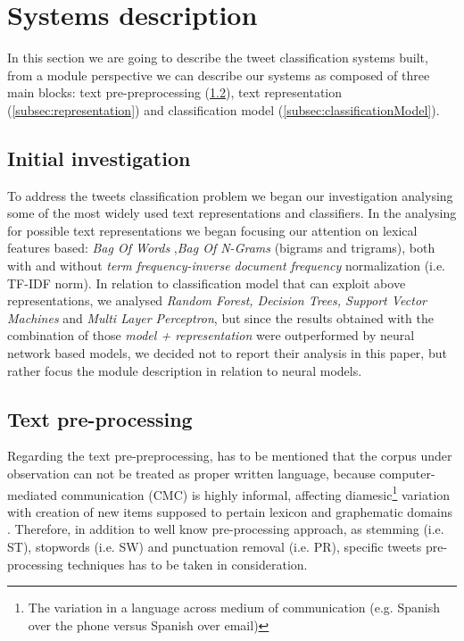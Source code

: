 \section{Systems description} \label{sec:system}

In this section we are going to describe the tweet classification systems built, from a module perspective we can describe our systems as composed of three main blocks: text pre-preprocessing (\cref{subsec:preprocessing}),  text representation (\cref{subsec:representation}) and classification model (\cref{subsec:classificationModel}). 


\subsection{Initial investigation} \label{subsec:boh}
To address the tweets classification problem we began our investigation analysing some of the most widely used text representations and classifiers.
In the analysing for possible text representations we began focusing our attention on lexical features based: \emph{Bag Of Words} \cite{harris1954distributional},\emph{Bag Of N-Grams} (bigrams and trigrams), both with and without \emph{term frequency-inverse document frequency} normalization (i.e. TF-IDF norm).
In relation to classification model that can exploit above representations,  we analysed \emph{Random Forest, Decision Trees, Support Vector Machines} and \emph{Multi Layer Perceptron}, but since the results obtained with the combination of those \emph{model + representation} were outperformed by neural network based models, we decided not to report their analysis in this paper, but rather focus the module description in relation to neural models.


\subsection{Text pre-processing} \label{subsec:preprocessing}

Regarding the text pre-preprocessing, has to be mentioned that the corpus under observation can not be treated as proper written language, because computer-mediated communication (CMC) is highly informal, affecting diamesic\footnote{The variation in a language across medium of communication (e.g. Spanish over the phone versus Spanish over email)} variation with creation of new items supposed to pertain lexicon and graphematic domains \cite{bazzanella2011oscillazioni,cerruti2013netspeak}.
Therefore, in addition to well know pre-processing approach, as stemming (i.e. ST), stopwords (i.e. SW) and punctuation removal (i.e. PR), specific tweets pre-processing techniques has to be taken in consideration.

